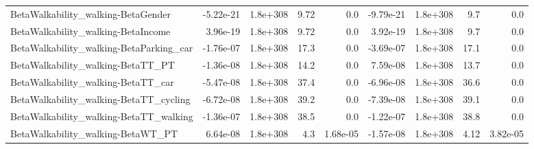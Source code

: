 \begin{tabular}{lrrrrrrrr}
BetaWalkability_walking-BetaGender & -5.22e-21 & 1.8e+308 & 9.72 & 0.0 & -9.79e-21 & 1.8e+308 & 9.7 & 0.0 \\
BetaWalkability_walking-BetaIncome & 3.96e-19 & 1.8e+308 & 9.72 & 0.0 & 3.92e-19 & 1.8e+308 & 9.7 & 0.0 \\
BetaWalkability_walking-BetaParking_car & -1.76e-07 & 1.8e+308 & 17.3 & 0.0 & -3.69e-07 & 1.8e+308 & 17.1 & 0.0 \\
BetaWalkability_walking-BetaTT_PT & -1.36e-08 & 1.8e+308 & 14.2 & 0.0 & 7.59e-08 & 1.8e+308 & 13.7 & 0.0 \\
BetaWalkability_walking-BetaTT_car & -5.47e-08 & 1.8e+308 & 37.4 & 0.0 & -6.96e-08 & 1.8e+308 & 36.6 & 0.0 \\
BetaWalkability_walking-BetaTT_cycling & -6.72e-08 & 1.8e+308 & 39.2 & 0.0 & -7.39e-08 & 1.8e+308 & 39.1 & 0.0 \\
BetaWalkability_walking-BetaTT_walking & -1.36e-07 & 1.8e+308 & 38.5 & 0.0 & -1.22e-07 & 1.8e+308 & 38.8 & 0.0 \\
BetaWalkability_walking-BetaWT_PT & 6.64e-08 & 1.8e+308 & 4.3 & 1.68e-05 & -1.57e-08 & 1.8e+308 & 4.12 & 3.82e-05 \\
\end{tabular}
